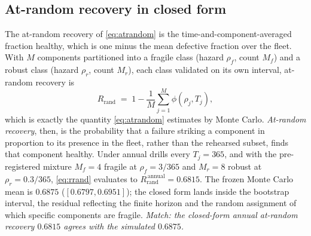 \documentclass[journal]{IEEEtran}
\begin{document}
\subsection{At-random recovery in closed form}
The at-random recovery of \eqref{eq:atrandom} is the time-and-component-averaged fraction healthy,
which is one minus the mean defective fraction over the fleet. With $M$ components partitioned into a
fragile class (hazard $\rho_f$, count $M_f$) and a robust class (hazard $\rho_r$, count $M_r$), each
class validated on its own interval, at-random recovery is
\begin{equation}
\label{eq:rrand}
R_{\mathrm{rand}} \;=\; 1 - \frac{1}{M}\!\sum_{j=1}^{M} \phi(\rho_j, T_j),
\end{equation}
which is exactly the quantity \eqref{eq:atrandom} estimates by Monte Carlo. \emph{At-random recovery},
then, is the probability that a failure striking a component in proportion to its presence in the
fleet, rather than the rehearsed subset, finds that component healthy. Under annual drills every
$T_j = 365$, and with the pre-registered mixture $M_f = 4$ fragile at $\rho_f = 3/365$ and $M_r = 8$
robust at $\rho_r = 0.3/365$, \eqref{eq:rrand} evaluates to $R_{\mathrm{rand}}^{\,\mathrm{annual}} =
0.6815$. The frozen Monte Carlo mean is $0.6875$ ($[0.6797, 0.6951]$); the closed form lands inside
the bootstrap interval, the residual reflecting the finite horizon and the random assignment of which
specific components are fragile. \emph{Match: the closed-form annual at-random recovery $0.6815$
agrees with the simulated $0.6875$.}
\end{document}
